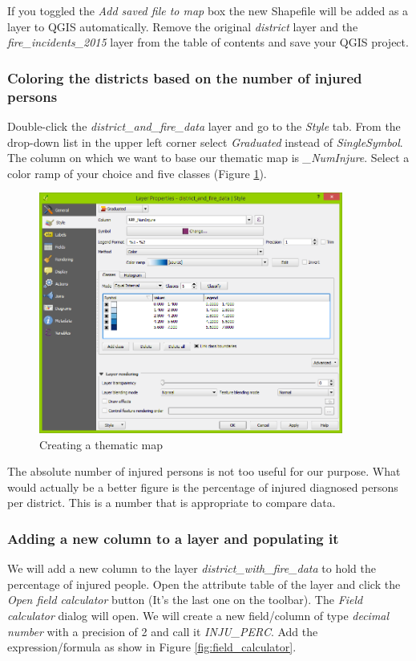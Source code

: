 \documentclass[a4paper,12pt,titlepage]{article}
\begin{document}
If you toggled the \textit{Add saved file to map} box the new Shapefile will be added as a layer to QGIS automatically. Remove the original \textit{district} layer and the \textit{fire\_incidents\_2015} layer from the table of contents and save your QGIS project.

\subsubsection{Coloring the districts based on the number of injured persons}
Double-click the \textit{district\_and\_fire\_data} layer and go to the \textit{Style} tab. From the drop-down list in the upper left corner select \textit{Graduated} instead of \textit{SingleSymbol}. The column on which we want to base our thematic map is \textit{\_NumInjure}.
Select a color ramp of your choice and five classes (Figure \ref{fig:thematic1}).

\begin{figure}[h]
\centering
\includegraphics[width=10cm]{Images/thematic1.png}
\caption{Creating a thematic map}\label{fig:thematic1}
\end{figure}

The absolute number of injured persons is not too useful for our purpose. What would actually be a better figure is the percentage of injured diagnosed persons per district. This is a number that is appropriate to compare data.

\subsubsection{Adding a new column to a layer and populating it}
We will add a new column to the layer \textit{district\_with\_fire\_data} to hold the percentage of injured people. Open the attribute table of the layer and click the \textit{Open field calculator} button (It's the last one on the toolbar). The \textit{Field calculator} dialog will open.
We will create a new field/column of type \textit{decimal number} with a precision of 2 and call it \textit{INJU\_PERC}. Add the expression/formula as show in Figure \ref{fig:field_calculator}.
\end{document}
